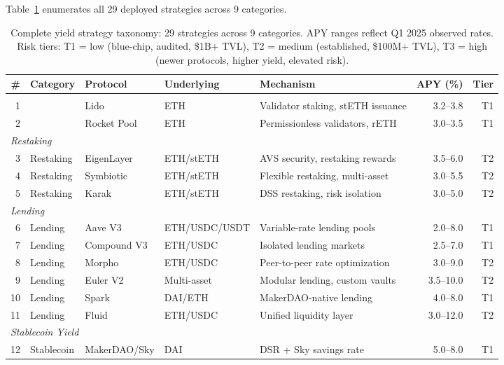 Table~\ref{tab:full_strategies} enumerates all 29 deployed strategies across 9 categories.

\begin{table}[t]
\centering
\small
\caption{Complete yield strategy taxonomy: 29 strategies across 9 categories. APY ranges reflect Q1 2025 observed rates. Risk tiers: T1 = low (blue-chip, audited, \$1B+ TVL), T2 = medium (established, \$100M+ TVL), T3 = high (newer protocols, higher yield, elevated risk).}
\label{tab:full_strategies}
\begin{tabular}{@{}rllllrr@{}}
\toprule
\textbf{\#} & \textbf{Category} & \textbf{Protocol} & \textbf{Underlying} & \textbf{Mechanism} & \textbf{APY (\%)} & \textbf{Tier} \\
\midrule
\multicolumn{7}{l}{\textit{}} \\
1 &  & Lido & ETH & Validator staking, stETH issuance & 3.2--3.8 & T1 \\
2 &  & Rocket Pool & ETH & Permissionless validators, rETH & 3.0--3.5 & T1 \\
\midrule
\multicolumn{7}{l}{\textit{Restaking}} \\
3 & Restaking & EigenLayer & ETH/stETH & AVS security, restaking rewards & 3.5--6.0 & T2 \\
4 & Restaking & Symbiotic & ETH/stETH & Flexible restaking, multi-asset & 3.0--5.5 & T2 \\
5 & Restaking & Karak & ETH/stETH & DSS restaking, risk isolation & 3.0--5.0 & T2 \\
\midrule
\multicolumn{7}{l}{\textit{Lending}} \\
6 & Lending & Aave V3 & ETH/USDC/USDT & Variable-rate lending pools & 2.0--8.0 & T1 \\
7 & Lending & Compound V3 & ETH/USDC & Isolated lending markets & 2.5--7.0 & T1 \\
8 & Lending & Morpho & ETH/USDC & Peer-to-peer rate optimization & 3.0--9.0 & T2 \\
9 & Lending & Euler V2 & Multi-asset & Modular lending, custom vaults & 3.5--10.0 & T2 \\
10 & Lending & Spark & DAI/ETH & MakerDAO-native lending & 4.0--8.0 & T1 \\
11 & Lending & Fluid & ETH/USDC & Unified liquidity layer & 3.0--12.0 & T2 \\
\midrule
\multicolumn{7}{l}{\textit{Stablecoin Yield}} \\
12 & Stablecoin & MakerDAO/Sky & DAI & DSR + Sky savings rate & 5.0--8.0 & T1 \\

\end{tabular}
\end{table}
